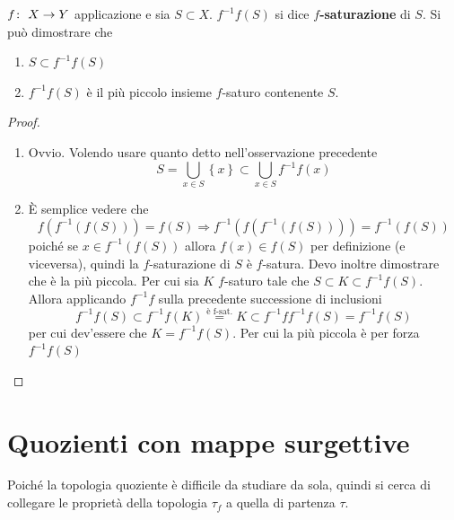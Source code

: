 \begin{theorem}
	$f \colon\ X \rightarrow Y$ applicazione e sia $S \subset X$. $f^{-1}f(S)$ si dice \textbf{$f$-saturazione} di $S$. Si può dimostrare che 
	\begin{enumerate}
		\item $S \subset f^{-1}f(S)$
		\item $f^{-1}f(S)$ è il più piccolo insieme $f$-saturo contenente $S$.
	\end{enumerate}
\end{theorem}
\begin{proof}
	\begin{enumerate}
		\item Ovvio. Volendo usare quanto detto nell'osservazione precedente
		\begin{equation*}
			S = \bigcup_{x\in S} \left\{x\right\} \subset \bigcup_{x \in S} f^{-1}f(x)
		\end{equation*}
		\item È semplice vedere che
		\begin{equation*}
			f(f^{-1}(f(S))) = f(S) \Longrightarrow f^{-1}(f(f^{-1}(f(S)))) = f^{-1}(f(S))
		\end{equation*}
		poiché se $x \in f^{-1}(f(S))$ allora $f(x) \in f(S)$ per definizione (e viceversa), quindi la $f$-saturazione di $S$ è $f$-satura. Devo inoltre dimostrare che è la più piccola. Per cui sia $K$ $f$-saturo tale che $S \subset K \subset f^{-1}f(S)$. Allora applicando $f^{-1}f$ sulla precedente successione di inclusioni
		\begin{equation*}
			f^{-1}f(S) \subset f^{-1}f(K) \overset{\text{è f-sat.}}{=} K \subset f^{-1}ff^{-1}f(S) = f^{-1}f(S) 
		\end{equation*}
		per cui dev'essere che $K = f^{-1}f(S)$. Per cui la più piccola è per forza $f^{-1}f(S)$ 
	\end{enumerate}
\end{proof}


\section{Quozienti con mappe surgettive}

Poiché la topologia quoziente è difficile da studiare da sola, quindi si  cerca di collegare le proprietà della topologia $\tau_f$ a quella di partenza $\tau$.

